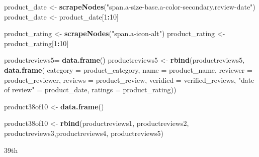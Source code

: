 \documentclass[
]{article}
\newenvironment{Shaded}{\begin{snugshade}}{\end{snugshade}}
\newcommand{\AttributeTok}[1]{\textcolor[rgb]{0.13,0.29,0.53}{#1}}
\newcommand{\DecValTok}[1]{\textcolor[rgb]{0.00,0.00,0.81}{#1}}
\newcommand{\FunctionTok}[1]{\textcolor[rgb]{0.13,0.29,0.53}{\textbf{#1}}}
\newcommand{\NormalTok}[1]{#1}
\newcommand{\OtherTok}[1]{\textcolor[rgb]{0.56,0.35,0.01}{#1}}
\newcommand{\SpecialCharTok}[1]{\textcolor[rgb]{0.81,0.36,0.00}{\textbf{#1}}}
\newcommand{\StringTok}[1]{\textcolor[rgb]{0.31,0.60,0.02}{#1}}
\begin{document}
\begin{Shaded}
\begin{Highlighting}[]
\NormalTok{  product\_date }\OtherTok{\textless{}{-}} \FunctionTok{scrapeNodes}\NormalTok{(}\StringTok{"span.a{-}size{-}base.a{-}color{-}secondary.review{-}date"}\NormalTok{)}
\NormalTok{  product\_date }\OtherTok{\textless{}{-}}\NormalTok{ product\_date[}\DecValTok{1}\SpecialCharTok{:}\DecValTok{10}\NormalTok{]}
  
\NormalTok{  product\_rating }\OtherTok{\textless{}{-}} \FunctionTok{scrapeNodes}\NormalTok{(}\StringTok{"span.a{-}icon{-}alt"}\NormalTok{)}
\NormalTok{  product\_rating }\OtherTok{\textless{}{-}}\NormalTok{ product\_rating[}\DecValTok{1}\SpecialCharTok{:}\DecValTok{10}\NormalTok{]}
  
\NormalTok{  productreviews5}\OtherTok{=} \FunctionTok{data.frame}\NormalTok{()}
\NormalTok{  productreviews5 }\OtherTok{\textless{}{-}} \FunctionTok{rbind}\NormalTok{(productreviews5, }\FunctionTok{data.frame}\NormalTok{(}
                      \AttributeTok{category =}\NormalTok{ product\_category,}
                      \AttributeTok{name =}\NormalTok{ product\_name,}
                      \AttributeTok{reviewer =}\NormalTok{ product\_reviewer,}
                      \AttributeTok{reviews =}\NormalTok{ product\_review,}
                      \AttributeTok{veridied =}\NormalTok{ verified\_reviews,}
                      \StringTok{"date of review"} \OtherTok{=}\NormalTok{ product\_date,}
                      \AttributeTok{ratings =}\NormalTok{ product\_rating))}
  
\NormalTok{  product38of10 }\OtherTok{\textless{}{-}} \FunctionTok{data.frame}\NormalTok{()}
  
\NormalTok{  product38of10 }\OtherTok{\textless{}{-}} \FunctionTok{rbind}\NormalTok{(productreviews1, productreviews2, productreviews3,productreviews4, productreviews5)}
\end{Highlighting}
\end{Shaded}

39th
\end{document}
